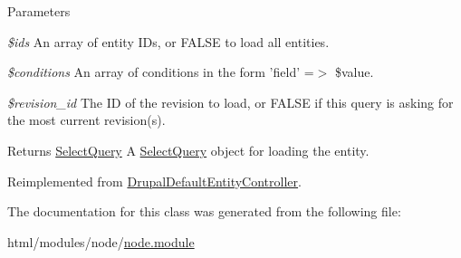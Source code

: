 \begin{DoxyParams}{Parameters}
\item[{\em \$ids}]An array of entity IDs, or FALSE to load all entities. \item[{\em \$conditions}]An array of conditions in the form 'field' =$>$ \$value. \item[{\em \$revision\_\-id}]The ID of the revision to load, or FALSE if this query is asking for the most current revision(s).\end{DoxyParams}
\begin{DoxyReturn}{Returns}
\hyperlink{classSelectQuery}{SelectQuery} A \hyperlink{classSelectQuery}{SelectQuery} object for loading the entity. 
\end{DoxyReturn}


Reimplemented from \hyperlink{classDrupalDefaultEntityController_aaa882d053aa4e04e2816b0093b79b0f8}{DrupalDefaultEntityController}.

The documentation for this class was generated from the following file:\begin{DoxyCompactItemize}
\item 
html/modules/node/\hyperlink{node_8module}{node.module}\end{DoxyCompactItemize}
